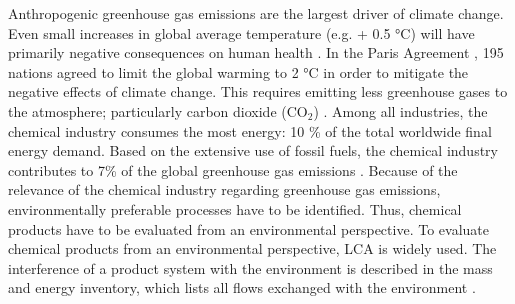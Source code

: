 Anthropogenic greenhouse gas emissions are the largest driver of climate change. Even small increases in global average temperature (e.g. + 0.5 °C)  will have primarily negative consequences on human health  \cite{HoeghGuldberg.2018}. In the Paris Agreement  \cite{UnitedNations.2015}, 195 nations agreed to limit the global warming to 2 °C in order to mitigate the negative effects of climate change. This requires emitting less greenhouse gases to the atmosphere; particularly carbon dioxide (CO$_2$)  \cite{RogeljJ.ShindellD..2018}. 
Among all industries, the chemical industry consumes the most energy: 10 \% of the total worldwide final energy demand. Based on the extensive use of fossil fuels, the chemical industry contributes to 7\%  of the global greenhouse gas emissions \cite{InternationalEnergyAgency.2013}. Because of the relevance of the chemical industry regarding greenhouse gas emissions, environmentally preferable processes have to be identified. Thus, chemical products have to be evaluated from an environmental perspective. To evaluate chemical products from an environmental perspective, \acf{LCA} is widely used. The interference of a product system with the environment is described in the mass and energy inventory, which lists all flows exchanged with the environment  \cite{InternationalOrganizationforStandardization.2006}. %

